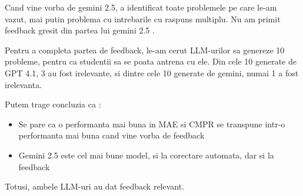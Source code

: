\documentclass[12pt, a4paper]{report}
\begin{document}
Cand vine vorba de gemini 2.5, a identificat toate problemele pe care le-am vazut, mai putin problema cu intrebarile cu raspuns multiplu.
Nu am primit feedback gresit din partea lui gemini 2.5 .

Pentru a completa partea de feedback,
le-am cerut LLM-urilor sa genereze 10 probleme,
pentru ca studentii sa se poata antrena cu ele. 
Din cele 10 generate de GPT 4.1, 3 au fost irelevante, si dintre cele 10 generate de gemini, numai 1 a fost irelevanta.

Putem trage concluzia ca :
\begin{itemize}
  \item Se pare ca o performanta mai buna in MAE si CMPR se transpune intr-o performanta mai buna cand vine vorba de feedback
  \item Gemini 2.5 este cel mai bune model, si la corectare automata, dar si la feedback
\end{itemize}

Totusi, ambele LLM-uri au dat feedback relevant.


\printbibliography[heading=bibintoc]
\end{document}
